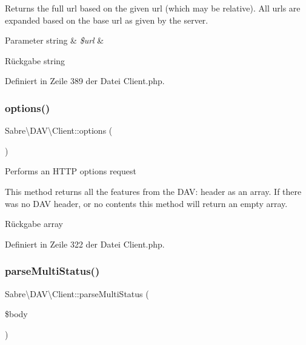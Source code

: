 Returns the full url based on the given url (which may be relative). All urls are expanded based on the base url as given by the server.


\begin{DoxyParams}[1]{Parameter}
string & {\em \$url} & \\
\hline
\end{DoxyParams}
\begin{DoxyReturn}{Rückgabe}
string 
\end{DoxyReturn}


Definiert in Zeile 389 der Datei Client.\+php.

\mbox{\label{class_sabre_1_1_d_a_v_1_1_client_aa90829863502b6b04c4984ea0779dd6a}} 
\subsubsection{\texorpdfstring{options()}{options()}}
{\footnotesize\ttfamily Sabre\textbackslash{}\+D\+A\+V\textbackslash{}\+Client\+::options (\begin{DoxyParamCaption}{ }\end{DoxyParamCaption})}

Performs an H\+T\+TP options request

This method returns all the features from the \textquotesingle{}D\+AV\+:\textquotesingle{} header as an array. If there was no D\+AV header, or no contents this method will return an empty array.

\begin{DoxyReturn}{Rückgabe}
array 
\end{DoxyReturn}


Definiert in Zeile 322 der Datei Client.\+php.

\mbox{\label{class_sabre_1_1_d_a_v_1_1_client_a06d8fa74595cb429c2efdb718f775a9c}} 
\subsubsection{\texorpdfstring{parse\+Multi\+Status()}{parseMultiStatus()}}
{\footnotesize\ttfamily Sabre\textbackslash{}\+D\+A\+V\textbackslash{}\+Client\+::parse\+Multi\+Status (\begin{DoxyParamCaption}\item[{}]{\$body }\end{DoxyParamCaption})}

